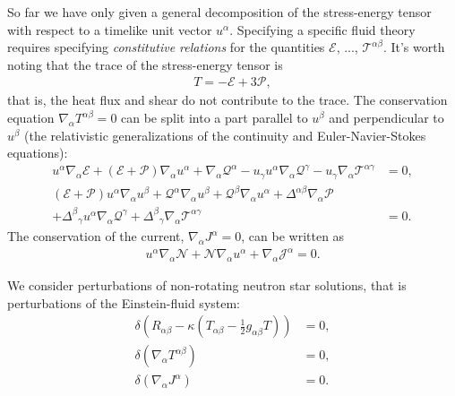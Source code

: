 \documentclass[12pt]{report}
\begin{document}
So far we have only given a general decomposition of the stress-energy
tensor with respect to a timelike unit vector $u^{\alpha}$.
Specifying a specific fluid theory requires specifying 
\emph{constitutive relations} for the quantities 
$\mathcal{E}$, ..., $\mathcal{T}^{\alpha\beta}$. 
It's worth noting that the trace of the stress-energy tensor is
\begin{align}
    T
    =
    -
    \mathcal{E}
    +
    3\mathcal{P}
    ,
\end{align}
that is, the heat flux and shear do not contribute to the trace.
The conservation equation $\nabla_{\alpha}T^{\alpha\beta}=0$ can be split into 
a part parallel to $u^{\beta}$ and perpendicular to $u^{\beta}$ 
(the relativistic generalizations of the continuity and
Euler-Navier-Stokes equations):
\begin{align}
    u^{\alpha}\nabla_{\alpha}\mathcal{E}
    +
    \left(\mathcal{E} + \mathcal{P}\right)\nabla_{\alpha}u^{\alpha}
    +
    \nabla_{\alpha}\mathcal{Q}^{\alpha}
    -
    u_{\gamma}u^{\alpha}\nabla_{\alpha}\mathcal{Q}^{\gamma}
    -
    u_{\gamma}\nabla_{\alpha}\mathcal{T}^{\alpha\gamma}
    &=
    0
    ,\\
    \left(\mathcal{E} + \mathcal{P}\right)u^{\alpha}\nabla_{\alpha}u^{\beta}
    +
    \mathcal{Q}^{\alpha}\nabla_{\alpha}u^{\beta}
    +
    \mathcal{Q}^{\beta}\nabla_{\alpha}u^{\alpha}
    +
    \Delta^{\alpha\beta}\nabla_{\alpha}\mathcal{P}
    \qquad
    &\nonumber\\
    +
    \Delta^{\beta}{}_{\gamma}u^{\alpha}\nabla_{\alpha}\mathcal{Q}^{\gamma}
    +
    \Delta^{\beta}{}_{\gamma}\nabla_{\alpha}\mathcal{T}^{\alpha\gamma}
    &=
    0
    .
\end{align}
The conservation of the current, $\nabla_{\alpha}J^{\alpha}=0$, can be written as
\begin{align}
   u^{\alpha}\nabla_{\alpha}\mathcal{N}
   +
   \mathcal{N}\nabla_{\alpha}u^{\alpha}
   +
   \nabla_{\alpha}\mathcal{J}^{\alpha}
   =
   0
   .
\end{align}

We consider perturbations of non-rotating neutron star solutions, that
is perturbations of the Einstein-fluid system:
\begin{align}
   \delta \left(
        R_{\alpha\beta} 
        - 
        \kappa 
        \left(
            T_{\alpha\beta}
            -
            \frac{1}{2}g_{\alpha\beta}T
        \right)
    \right) 
   &= 
   0 
   ,\\
   \delta \left(\nabla_{\alpha}T^{\alpha\beta}\right)
   &=
   0
   ,\\
   \delta\left(\nabla_{\alpha}J^{\alpha}\right)
   &=
   0
   .
\end{align}
\end{document}
